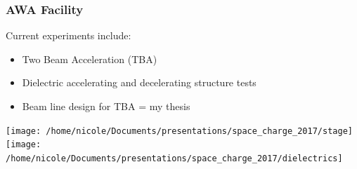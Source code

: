 \documentclass[professionalfonts,t]{beamer}
\begin{document}
\begin{frame}
\frametitle{AWA Facility}
Current experiments include:
\begin{itemize}
	\item{Two Beam Acceleration (TBA)}
	\item{Dielectric accelerating and decelerating structure tests}
	\item{Beam line design for TBA = my thesis}
\end{itemize}
\vspace{0.5cm}
\texttt{[image: /home/nicole/Documents/presentations/space\_charge\_2017/stage]}\hfill\texttt{[image: /home/nicole/Documents/presentations/space\_charge\_2017/dielectrics]}
\end{frame}
\end{document}
